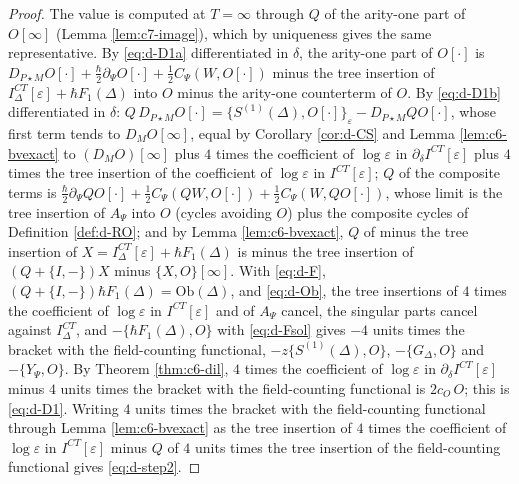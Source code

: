 \begin{proof}
The value is computed at $T=\infty$ through $Q$ of the arity-one part of $O[\infty]$ (Lemma \ref{lem:c7-image}), which by uniqueness gives the same representative. By \eqref{eq:d-D1a} differentiated in $\delta$, the arity-one part of $O[\cdot]$ is $D_{P\star M}O[\cdot]+\tfrac\hbar2\partial_\Psi O[\cdot]+\tfrac12C_\Psi(W,O[\cdot])$ minus the tree insertion of $I^{CT}_\Delta[\varepsilon]+\hbar F_1(\Delta)$ into $O$ minus the arity-one counterterm of $O$. By \eqref{eq:d-D1b} differentiated in $\delta$: $Q\,D_{P\star M}O[\cdot]=\{S^{(1)}(\Delta),O[\cdot]\}_\varepsilon-D_{P\star M}QO[\cdot]$, whose first term tends to $D_MO[\infty]$, equal by Corollary \ref{cor:d-CS} and Lemma \ref{lem:c6-bvexact} to $(D_MO)[\infty]$ plus $4$ times the coefficient of $\log\varepsilon$ in $\partial_\delta I^{CT}[\varepsilon]$ plus $4$ times the tree insertion of the coefficient of $\log\varepsilon$ in $I^{CT}[\varepsilon]$; $Q$ of the composite terms is $\tfrac\hbar2\partial_\Psi QO[\cdot]+\tfrac12C_\Psi(QW,O[\cdot])+\tfrac12C_\Psi(W,QO[\cdot])$, whose limit is the tree insertion of $A_\Psi$ into $O$ (cycles avoiding $O$) plus the composite cycles of Definition \ref{def:d-RO}; and by Lemma \ref{lem:c6-bvexact}, $Q$ of minus the tree insertion of $X=I^{CT}_\Delta[\varepsilon]+\hbar F_1(\Delta)$ is minus the tree insertion of $(Q+\{I,-\})X$ minus $\{X,O\}[\infty]$. With \eqref{eq:d-F}, $(Q+\{I,-\})\hbar F_1(\Delta)=\mathrm{Ob}(\Delta)$, and \eqref{eq:d-Ob}, the tree insertions of $4$ times the coefficient of $\log\varepsilon$ in $I^{CT}[\varepsilon]$ and of $A_\Psi$ cancel, the singular parts cancel against $I^{CT}_\Delta$, and $-\{\hbar F_1(\Delta),O\}$ with \eqref{eq:d-Fsol} gives $-4$ units times the bracket with the field-counting functional, $-z\{S^{(1)}(\Delta),O\}$, $-\{G_\Delta,O\}$ and $-\{Y_\Psi,O\}$. By Theorem \ref{thm:c6-dil}, $4$ times the coefficient of $\log\varepsilon$ in $\partial_\delta I^{CT}[\varepsilon]$ minus $4$ units times the bracket with the field-counting functional is $2c_O\,O$; this is \eqref{eq:d-D1}. Writing $4$ units times the bracket with the field-counting functional through Lemma \ref{lem:c6-bvexact} as the tree insertion of $4$ times the coefficient of $\log\varepsilon$ in $I^{CT}[\varepsilon]$ minus $Q$ of $4$ units times the tree insertion of the field-counting functional gives \eqref{eq:d-step2}.
\end{proof}

